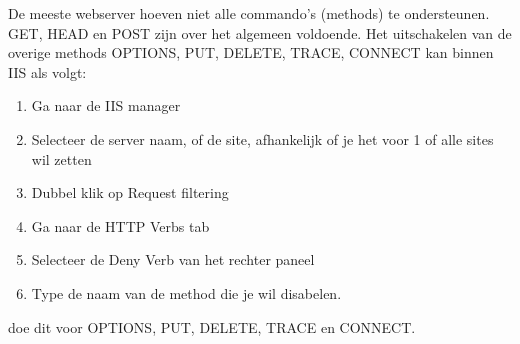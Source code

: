 De meeste webserver hoeven niet alle commando's (methods) te ondersteunen. GET, HEAD en POST zijn over het algemeen voldoende. Het uitschakelen van de overige methods OPTIONS, PUT, DELETE, TRACE, CONNECT kan binnen IIS als volgt:
\begin{enumerate}
\item Ga naar de IIS manager
\item Selecteer de server naam, of de site, afhankelijk of je het voor 1 of alle sites wil zetten
\item Dubbel klik op Request filtering
\item Ga naar de HTTP Verbs tab
\item Selecteer de Deny Verb van het rechter paneel
\item Type de naam van de method die je wil disabelen.
\end{enumerate}
doe dit voor OPTIONS, PUT, DELETE, TRACE en CONNECT.
